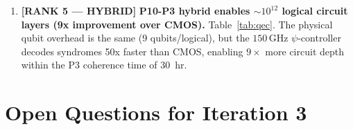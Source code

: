 \documentclass[11pt]{article}
\theoremstyle{definition}
\theoremstyle{remark}
\begin{document}
\begin{enumerate}
\item \textbf{[RANK 5 --- HYBRID]} \textbf{P10-P3 hybrid enables
$\sim 10^{12}$ logical circuit layers (9x improvement over CMOS).}
Table~\ref{tab:qec}. The physical qubit overhead is the same (9 qubits/logical),
but the $150\,\mathrm{GHz}$ $\psi$-controller decodes syndromes 50x
faster than CMOS, enabling $9\times$ more circuit depth within the P3
coherence time of 30~hr.

\end{enumerate}

\section{Open Questions for Iteration 3}
\label{sec:open_questions}
\end{document}
